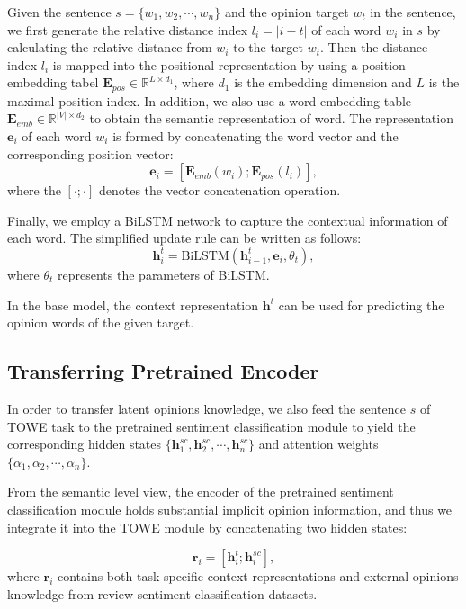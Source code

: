\documentclass[letterpaper]{article} \usepackage{aaai20}  \usepackage{times}  \usepackage{helvet} \usepackage{courier}  \usepackage[hyphens]{url}  \usepackage{graphicx} \urlstyle{rm} \def\UrlFont{\rm}  \usepackage{graphicx}
\begin{document}
Given the sentence  $s=\{w_1, w_2, \cdots, w_n\}$ and the opinion target $w_t$ in the sentence, we first generate the relative distance index $l_i=|i-t|$ of each word $w_i$ in $s$ by calculating the relative distance from $w_i$ to the target $w_t$. Then the distance index $l_i$ is mapped into the positional representation by using a position embedding tabel  $\mathbf{E}_{pos}\in \mathbb{R}^{L\times d_1}$, where $d_1$ is the embedding dimension and $L$ is the maximal position index. In addition, we also use a word embedding table $\mathbf{E}_{emb}\in \mathbb{R}^{|V|\times d_2}$ to obtain the semantic representation of word. The representation $\mathbf{e}_i$ of each word $w_i$ is formed by concatenating the word vector and the corresponding position vector:
\begin{equation}
	\mathbf{e}_i = \left [\mathbf{E}_{emb}(w_i); \mathbf{E}_{pos}(l_i) \right ],
\end{equation}
where the $\left [\cdot;\cdot \right ]$ denotes the vector concatenation operation.

Finally, we employ a BiLSTM network to capture the contextual information of each word. The simplified update rule can be written as follows:
\begin{equation}
	\mathbf{h}_i^t = \text{BiLSTM}(\mathbf{h}_{i-1}^t, \mathbf{e}_i, \theta_t ),
\end{equation}
where $\theta_t$ represents the parameters of BiLSTM.

In the base model, the context representation $\mathbf{h}^t$ can be used for predicting the opinion words of the given target.

\subsection{Transferring Pretrained Encoder}
In order to transfer latent opinions knowledge, we also feed the sentence $s$ of TOWE task to the pretrained sentiment classification module to yield the corresponding hidden states $\{\mathbf{h}^{sc}_1, \mathbf{h}^{sc}_2, \cdots, \mathbf{h}^{sc}_n\}$ and attention weights $\{\alpha_1, \alpha_2, \cdots, \alpha_n\}$.

From the semantic level view, the encoder of the pretrained sentiment classification module holds substantial implicit opinion information, and thus we integrate it into the TOWE module by concatenating two hidden states:

\begin{equation}
	\mathbf{r}_i = \left [ \mathbf{h}^t_i; \mathbf{h}^{sc}_i \right ],
\end{equation}
where $\mathbf{r}_i$ contains both task-specific context representations and external opinions knowledge from review sentiment classification datasets.
\end{document}
